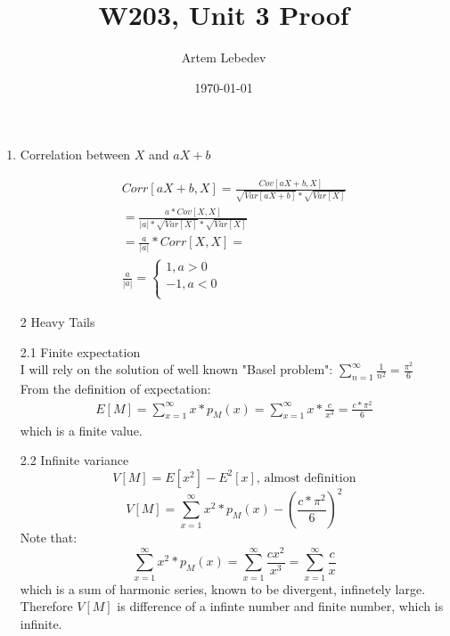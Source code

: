 \documentclass{article}
\author{Artem Lebedev}
\title{W203, Unit 3 Proof}
\date{\today}
\begin{document}
\maketitle

\begin{enumerate}
\item Correlation between $X$ and $aX+b$

\begin{align*}
	Corr[aX+b,X] = \frac{Cov[aX+b,X]}{\sqrt{Var[aX+b]}*\sqrt{Var[X]}}\\[1em] =\frac{a*Cov[X,X]}{{|a|}*\sqrt{Var[X]}*\sqrt{Var[X]}}\\[1em]
	=\frac{a}{|a|}*Corr[X,X] = \\[1em] \frac{a}{|a|} =
	\begin{cases}
	1, a>0\\
	-1, a<0\\
	\end{cases}  
\end{align*}

\item[2] Heavy Tails
\item[2.1] Finite expectation\\
I will rely on the solution of well known "Basel problem":  $\sum_{n = 1}^{\infty} \frac{1}{n^2} = \frac{\pi^2}{6}$\\[2em]From the definition of expectation:
\begin{align*}
	E[M]=\sum_{x = 1}^{\infty}x*p_M(x)=\sum_{x = 1}^{\infty}x*\frac{c}{x^3} = \frac{c*\pi^2}{6}
\end{align*}
which is a finite value.
\item[2.2] Infinite variance\\
$$V[M]=E[x^2]-E^2[x]\text{, almost definition}$$
$$V[M]=\sum_{x = 1}^{\infty}x^2*p_M(x) -  \left(\frac{c*\pi^2}{6}\right)^2$$
Note that:
$$\sum_{x = 1}^{\infty}x^2*p_M(x) = \sum_{x = 1}^{\infty}\frac{cx^2}{x^3} =\sum_{x = 1}^{\infty}\frac{c}{x}$$
which is a sum of harmonic series, known to be divergent, infinetely large. Therefore $V[M]$ is difference of a infinte number and finite number, which is infinite.
\end{enumerate}
\end{document}
